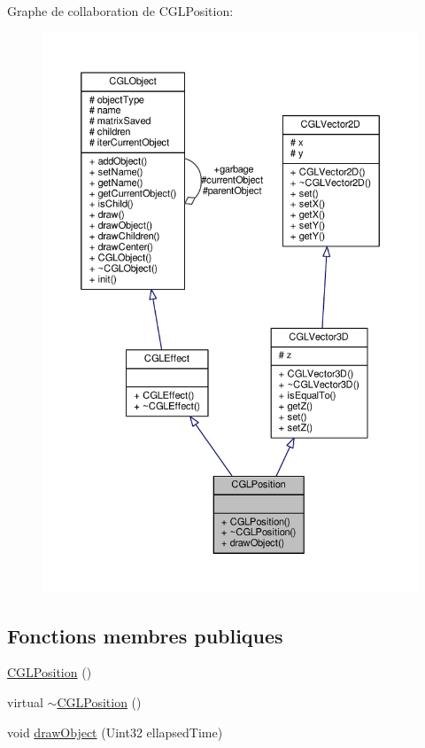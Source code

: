 Graphe de collaboration de C\-G\-L\-Position\-:\nopagebreak
\begin{figure}[H]
\begin{center}
\leavevmode
\includegraphics[width=350pt]{df/df1/class_c_g_l_position__coll__graph}
\end{center}
\end{figure}
\subsection*{Fonctions membres publiques}
\begin{DoxyCompactItemize}
\item 
\hyperlink{class_c_g_l_position_ab32bdd49fc31414e874917568e5d37d2}{C\-G\-L\-Position} ()
\item 
virtual \hyperlink{class_c_g_l_position_afe1ee045b528494d23286adf06aecae0}{$\sim$\-C\-G\-L\-Position} ()
\item 
void \hyperlink{class_c_g_l_position_a439ae873ba7ef56826a27eb7b15b0b6f}{draw\-Object} (Uint32 ellapsed\-Time)
\end{DoxyCompactItemize}
